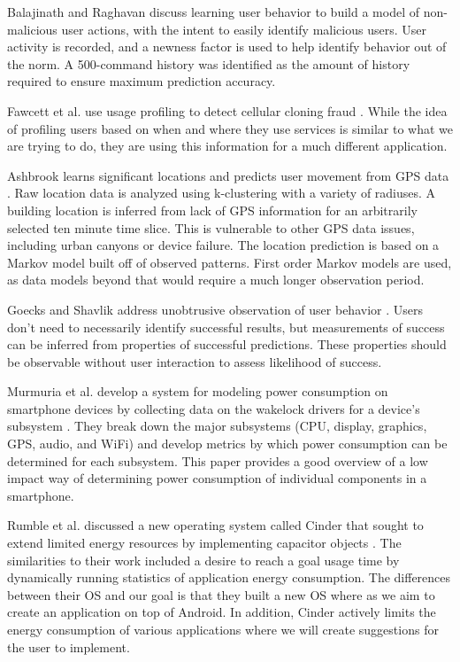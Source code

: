 Balajinath and Raghavan discuss learning user behavior to build a model of non-malicious user actions, with the intent to easily identify malicious users\cite{Balajinath:2001:IDT:2294491.2294970}. 
User activity is recorded, and a newness factor is used to help identify behavior out of the norm. 
A 500-command history was identified as the amount of history required to ensure maximum prediction accuracy. 

Fawcett et al. use usage profiling to detect cellular cloning fraud \cite{dataMiningFraudDetection}. 
While the idea of profiling users based on when and where they use services is similar to what we are trying to do, they are using this information for a much different application. 

Ashbrook learns significant locations and predicts user movement from GPS data \cite{Ashbrook:2002:LSL:862896.881068}. 
Raw location data is analyzed using k-clustering with a variety of radiuses. 
A building location is inferred from lack of GPS information for an arbitrarily selected ten minute time slice. 
This is vulnerable to other GPS data issues, including urban canyons or device failure. 
The location prediction is based on a Markov model built off of observed patterns. 
First order Markov models are used, as data models beyond that would require a much longer observation period. 

Goecks and Shavlik address unobtrusive observation of user behavior \cite{Goecks:2000:LUI:325737.325806}. 
Users don't need to necessarily identify successful results, but measurements of success can be inferred from properties of successful predictions. 
These properties should be observable without user interaction to assess likelihood of success. 

Murmuria et al. develop a system for modeling power consumption on smartphone devices by collecting data on the wakelock drivers for a device's subsystem \cite{mobilePowerUsageMeasurements}. 
They break down the major subsystems (CPU, display, graphics, GPS, audio, and WiFi) and develop metrics by which power consumption can be determined for each subsystem. 
This paper provides a good overview of a low impact way of determining power consumption of individual components in a smartphone. 

Rumble et al. discussed a new operating system called Cinder that sought to extend limited energy resources by implementing capacitor objects \cite{Rumble:2009:AJT:1592606.1592618}. 
The similarities to their work included a desire to reach a goal usage time by dynamically running statistics of application energy consumption. 
The differences between their OS and our goal is that they built a new OS where as we aim to create an application on top of Android. 
In addition, Cinder actively limits the energy consumption of various applications where we will create suggestions for the user to implement. 

